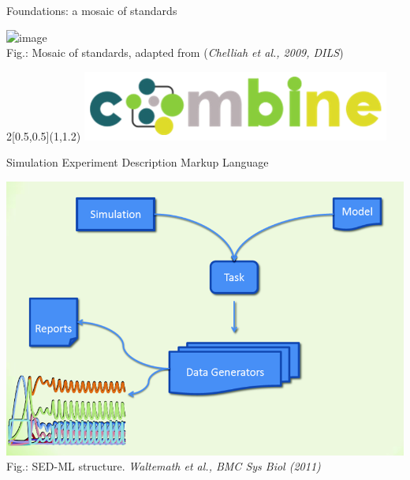 \documentclass[t,xcolor={usenames,dvipsnames}]{beamer}
\begin{document}
\begin{frame}{Foundations: a mosaic of standards}
\begin{center}
\includegraphics<1->[scale=.5]{standards_mosaic}\\
{\tiny Fig.: Mosaic of standards, adapted from (\textit{Chelliah et al., 2009, DILS})}
\end{center}
\begin{textblock}{2}[0.5,0.5](1,1.2)
\centering
\includegraphics[scale=.8]{COMBINE}
\end{textblock}
\end{frame}


\begin{frame}{Simulation Experiment Description Markup Language}
\begin{center}
\includegraphics[scale=.5]{SEDML_overview}\\
{\tiny Fig.: SED-ML structure. \textit{Waltemath et al., BMC Sys Biol (2011)}}
\end{center}
\end{frame}
\end{document}
